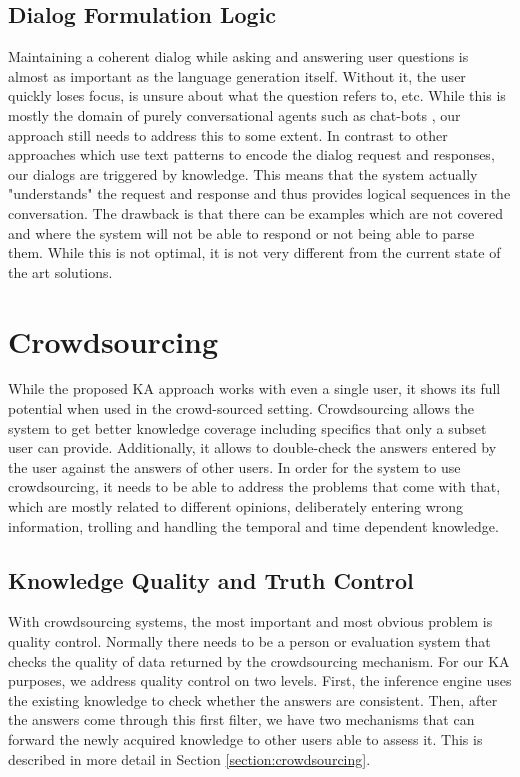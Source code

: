 \subsection{Dialog Formulation Logic}
Maintaining a coherent dialog while asking and answering user questions is 
almost as important as the language generation itself. Without it, the user 
quickly loses focus, is unsure about what the question refers to, etc. 
While this is mostly the domain of purely conversational agents such as 
chat-bots \parencite{Bradesko2012}, our approach still needs to address this to 
some extent. In contrast to other approaches which use text patterns to encode 
the dialog request and responses, our dialogs are triggered by knowledge. 
This means that the system actually "understands" the request and response and 
thus provides logical sequences in the conversation. The drawback is that there
can be examples which are not covered and where the system will not be able to
respond or not being able to parse them. While this is not optimal, it is not 
very different from the current state of the art solutions.

\section{Crowdsourcing}
\label{section:bg:crowdsourcing}
While the proposed KA approach works with even a single user, it shows its 
full potential when used in the crowd-sourced setting. Crowdsourcing allows 
the system to get better knowledge coverage including specifics that only a 
subset user can provide. Additionally, it allows to double-check the answers 
entered by the user against the answers of other users. In order for the system 
to use crowdsourcing, it needs to be able to address the problems that come 
with that, which are mostly related to different opinions, deliberately entering 
wrong information, trolling and handling the temporal and time dependent 
knowledge.

\subsection{Knowledge Quality and Truth Control} 
With crowdsourcing systems, the most important and most obvious problem is 
quality control. Normally there needs to be a person or evaluation system that 
checks the quality of data returned by the crowdsourcing mechanism. For our 
KA purposes, we address quality control on two levels. First, the inference 
engine uses the existing knowledge to check whether the answers are consistent. 
Then, after the answers come through this first filter, we have two mechanisms 
that can forward the newly acquired knowledge to other users able to assess it. 
This is described in more detail in Section \ref{section:crowdsourcing}.

